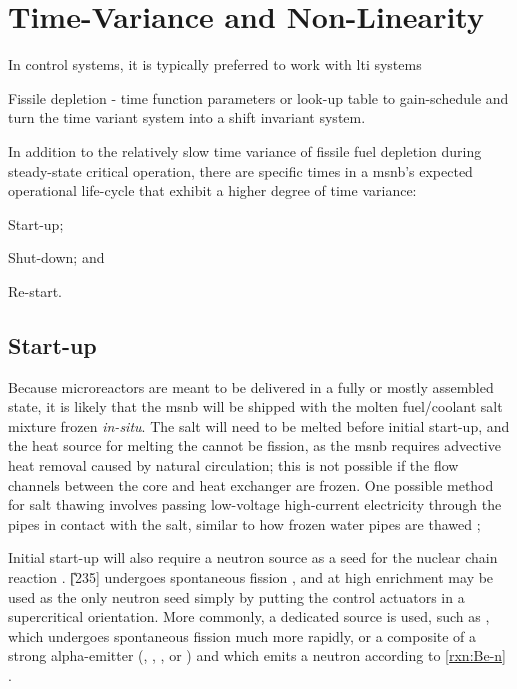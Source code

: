 \section{Time-Variance and Non-Linearity}
In control systems, it is typically preferred to work with \acf{lti} systems

Fissile depletion - time function parameters or look-up table to gain-schedule and turn the time variant system into a shift invariant system.

In addition to the relatively slow time variance of fissile fuel depletion during steady-state critical operation, there are specific times in a \acs{msnb}'s expected operational life-cycle that exhibit a higher degree of time variance: 
\begin{enumerate*}
\item Start-up; \item Shut-down; and \item Re-start.
\end{enumerate*}

\subsection{Start-up}
Because microreactors are meant to be delivered in a fully or mostly assembled state, it is likely that the \acs{msnb} will be shipped with the molten fuel/coolant salt mixture frozen \textit{in-situ}. The salt will need to be melted before initial start-up, and the heat source for melting the cannot be fission, as the \acs{msnb} requires advective heat removal caused by natural circulation; this is not possible if the flow channels between the core and heat exchanger are frozen. One possible method for salt thawing involves passing low-voltage high-current electricity through the pipes in contact with the salt, similar to how frozen water pipes are thawed \cite{Thawing};

Initial start-up will also require a neutron source as a seed for the nuclear chain reaction \cite{DH}. \U[235] undergoes spontaneous fission \cite{Faw}, and at high enrichment may be used as the only neutron seed simply by putting the control actuators in a supercritical orientation. More commonly, a dedicated source is used, such as \Ca[252], which undergoes spontaneous fission much more rapidly, or a composite of a strong alpha-emitter (\eg \Pu[238], \Am[241], \Po[210], or \Ra[226]) and \Be[9] which emits a neutron according to \ref{rxn:Be-n} \cite{Handbook}.


